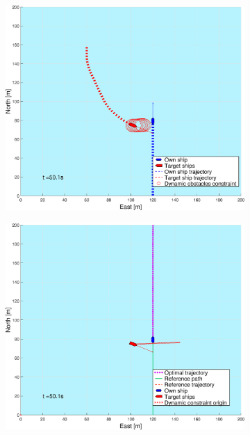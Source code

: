 \begin{figure}[ht!]
\begin{subfigure}[b]{0.494\textwidth}
        \subcaption{}
    \end{subfigure}
    \hfill
    \\
    \begin{subfigure}[b]{0.494\textwidth}
        \centering
        \includegraphics[width=\textwidth]{Images/Figures/sving_SO/_Simple_0fig1_time=50}
        \subcaption{}
    \end{subfigure}
    \hfill
    \begin{subfigure}[b]{0.494\textwidth}
        \centering
        \includegraphics[width=\textwidth]{Images/Figures/sving_SO/_Simple_0fig999_time=50}

\end{subfigure}
\end{figure}
